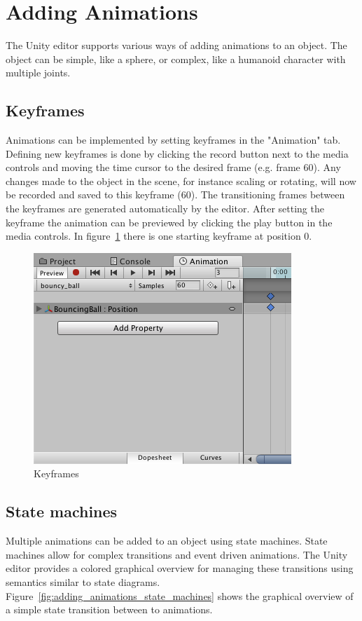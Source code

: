 \documentclass[12pt, a4paper, titlepage]{article}
\begin{document}
\section{Adding Animations}

The Unity editor supports various ways of adding animations to an object. The object can be simple, like a sphere, or complex, like a humanoid character with multiple joints. 

\subsection{Keyframes}

Animations can be implemented by setting keyframes in the "Animation" tab. Defining new keyframes is done by clicking the record button next to the media controls and moving the time cursor to the desired frame (e.g. frame 60). Any changes made to the object in the scene, for instance scaling or rotating, will now be recorded and saved to this keyframe (60). The transitioning frames between the keyframes are generated automatically by the editor. After setting the keyframe the animation can be previewed by clicking the play button in the media controls. In figure~\ref{fig:adding_animations_keyframes} there is one starting keyframe at position 0.

\begin{figure}[htbp]
  \centering
  \includegraphics[width=.4\textwidth]{pictures/keyframes}
  \caption{Keyframes}
  \label{fig:adding_animations_keyframes}
\end{figure}

\subsection{State machines}

Multiple animations can be added to an object using state machines. State machines allow for complex transitions and event driven animations. The Unity editor provides a colored graphical overview for managing these transitions using semantics similar to state diagrams. Figure~\ref{fig:adding_animations_state_machines} shows the graphical overview of a simple state transition between to animations.
\end{document}
